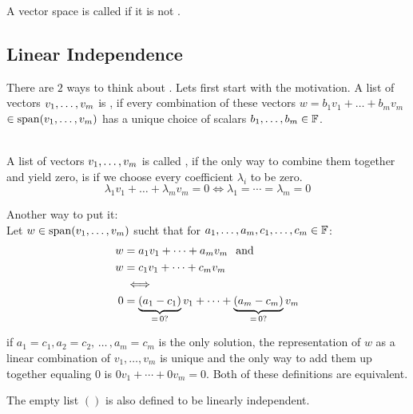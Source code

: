 \setcounter{thm}{12}
\begin{mydef}
  A vector space is called  if it is not \fd.
\end{mydef}


\subsection{Linear Independence}

\setcounter{thm}{14}
\begin{mydef} 
  There are $2$ ways to think about . Lets first start with the motivation. A list of vectors $v_1, \dots, v_m$ is \qt{\lid}, if every combination of these vectors $w = b_1v_1 + \dots+ b_mv_m$ $\in \operatorname{span} (v_1, \dots, v_m)$ has a unique choice of scalars $b_1, \dots, b_m \in \mathbb{F}$.

   \\
  A list of vectors $v_1, \dots, v_m$ is called \lid, if the only way to combine them together and yield zero, is if we choose every coefficient $\lambda_i$ to be zero.
  \begin{equation}
    \lambda_1v_1 + \dots + \lambda_mv_m = 0 \iff \lambda_1 = \cdots = \lambda_m = 0
  \end{equation}

  Another way to put it:\\
  Let $w\in \operatorname{span} (v_1, \dots, v_m)$ sucht that for $a_1, \dots, a_m, c_1, \dots, c_m \in \mathbb{F}$:
  \begin{equation}
    \begin{aligned}
      w & =a_1 v_1 + \cdots + a_m v_m \;\;\, \text{and}\;\; \\
      w & =c_1 v_1 + \cdots + c_m v_m \\
      & \iff \\
      0 & = \underbrace{(a_1 - c_1)}_{= \, 0\text{?}} v_1 + \cdots + \underbrace{(a_m -c_m)}_{= \, 0\text{?}} v_m
    \end{aligned}
  \end{equation}

  if $a_1 = c_1, a_2 = c_2, \, \dots \, , a_m = c_m$ is the only solution, the representation of $w$ as a linear combination of $v_1, \ldots, v_m$ is unique and the only way to add them up together equaling $0$ is $0v_1+\cdots+0v_m=0$. Both of these definitions are equivalent.

  The empty list $()$ is also defined to be linearly independent.
\end{mydef}


